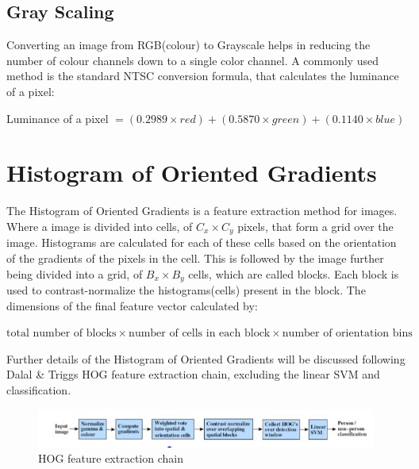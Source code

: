	\subsection{Gray Scaling}
	Converting an image from RGB(colour) to Grayscale helps in reducing the number of colour channels down to a single color channel. A commonly used method is the standard NTSC conversion formula, that calculates the luminance of a pixel\cite{pre}:

	Luminance of a pixel $= (0.2989 \times red) + (0.5870 \times green) + (0.1140 \times blue) $
	 
\section{Histogram of Oriented Gradients}   
The Histogram of Oriented Gradients is a feature extraction method for images. Where a image is divided into cells, of $C_x \times C_y$ pixels, that form a grid over the image. Histograms are calculated for each of these cells based on the orientation of the gradients of the pixels in the cell. This is followed by the image further being divided into a grid, of $B_x \times B_y$ cells, which are called blocks. Each block is used to contrast-normalize the histograms(cells) present in the block. The dimensions of the final feature vector calculated by: 

$\textrm{total number of blocks} \times \textrm{number of cells in each block} \times \textrm{number of orientation bins}$
\begin{flushleft}
Further details of the Histogram of Oriented Gradients will be discussed following Dalal \& Triggs HOG feature extraction chain, excluding the linear SVM and classification\cite{hog}.
\end{flushleft}
\begin{figure}[H]
  \centering
  \includegraphics[scale=0.6]{chain}
  \caption{HOG feature extraction chain}
\end{figure}

